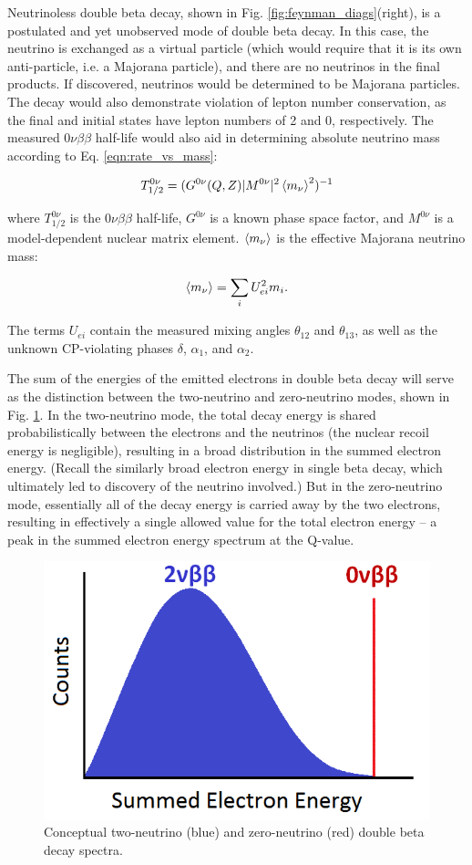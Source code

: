 Neutrinoless double beta decay, shown in Fig. \ref{fig:feynman_diags}(right), is a postulated and yet unobserved mode of double beta decay. In this case, the neutrino is exchanged as a virtual particle (which would require that it is its own anti-particle, i.e. a Majorana particle), and there are no neutrinos in the final products. If discovered, neutrinos would be determined to be Majorana particles.  The decay would also demonstrate violation of lepton number conservation, as the final and initial states have lepton numbers of 2 and 0, respectively.  The measured $0\nu\beta\beta$ half-life would also aid in determining absolute neutrino mass according to Eq. \ref{eqn:rate_vs_mass}:

\begin{equation}
T_{1/2}^{0\nu} = (G^{0\nu}(Q,Z)|M^{0\nu}|^{2}\braket{m_{\nu}}^{2})^{-1}
\label{eqn:rate_vs_mass}
\end{equation}

\noindent
where $T_{1/2}^{0\nu}$ is the $0\nu\beta\beta$ half-life,  $G^{0\nu}$ is a known phase space factor, and $M^{0\nu}$ is a model-dependent nuclear matrix element.  $\braket{m_{\nu}}$ is the effective Majorana neutrino mass:

\begin{equation}
\braket{m_{\nu}} = \sum\limits_{i} U_{ei}^{2} m_{i}.
\label{eqn:effectivemass}
\end{equation}

\noindent
The terms $U_{ei}$ contain the measured mixing angles $\theta_{12}$ and $\theta_{13}$, as well as the unknown CP-violating phases $\delta$, $\alpha_1$, and $\alpha_2$.

The sum of the energies of the emitted electrons in double beta decay will serve as the distinction between the two-neutrino and zero-neutrino modes, shown in Fig. \ref{fig:spectrum_bb}. In the two-neutrino mode, the total decay energy is shared probabilistically between the electrons and the neutrinos (the nuclear recoil energy is negligible), resulting in a broad distribution in the summed electron energy. (Recall the similarly broad electron energy in single beta decay, which ultimately led to discovery of the neutrino involved.) But in the zero-neutrino mode, essentially all of the decay energy is carried away by the two electrons, resulting in effectively a single allowed value for the total electron energy -- a peak in the summed electron energy spectrum at the Q-value. 

\begin{figure} %
        \centering
                \includegraphics[width=.5\textwidth]{figures/spectrum_bb.png}
                \caption{Conceptual two-neutrino (blue) and zero-neutrino (red) double beta decay spectra.}
\label{fig:spectrum_bb}
\end{figure}

